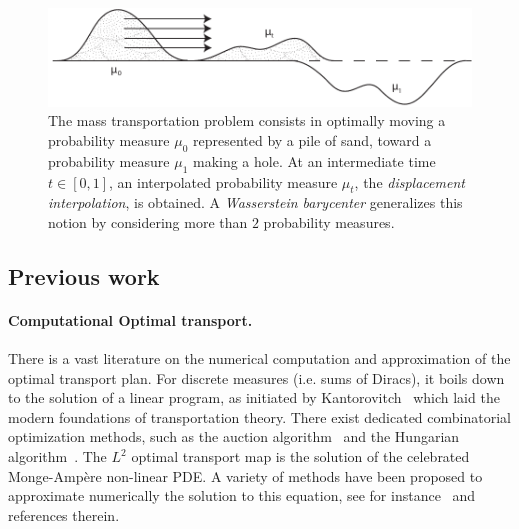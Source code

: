 \vspace{0.3cm}
\begin{figure}[!t]
\begin{center}
\includegraphics[width=\linewidth]{img/monge.pdf}
\end{center}
\caption{The mass transportation problem consists in optimally moving a probability measure $\mu_0$ represented by a pile of sand, toward a probability measure $\mu_1$ making a hole. At an intermediate time $t \in [0,1]$, an interpolated probability measure $\mu_t$, the \textit{displacement interpolation}, is obtained. A \textit{Wasserstein barycenter} generalizes this notion by considering more than $2$ probability measures.}
\label{fig:monge}
\end{figure}


\subsection{Previous work}

\paragraph{Computational Optimal transport.}

There is a vast literature on the numerical computation and approximation of the optimal transport plan. For discrete measures ({i.e.} sums of Dir\-acs), it boils down to the solution of a linear program, as initiated by Kantorovitch~\cite{Kantorovich42} which laid the modern foundations of transportation theory. There exist dedicated combinatorial optimization methods, such as the auction algorithm~\cite{Bertsekas1988} and the Hungarian algorithm~\cite{Kuhn-hungarian}. The $L^2$ optimal transport map is the solution of the celebrated Monge-Amp\`ere non-linear PDE. A variety of methods have been proposed to approximate numerically the solution to this equation, see for instance~\cite{Benamou2012} and references therein. 

